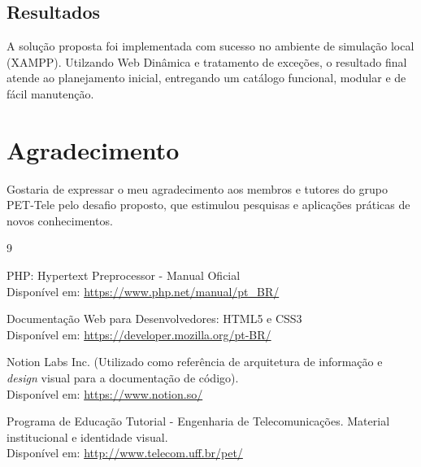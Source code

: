 \documentclass[12pt,a4paper]{article}
\begin{document}
\subsection{Resultados}
A solução proposta foi implementada com sucesso no ambiente de simulação local (XAMPP). Utilzando Web Dinâmica e tratamento de exceções, o resultado final atende ao planejamento inicial, entregando um catálogo funcional, modular e de fácil manutenção.

\newpage

\section*{Agradecimento}
Gostaria de expressar o meu agradecimento aos membros e tutores do grupo PET-Tele pelo desafio proposto, que estimulou pesquisas e aplicações práticas de novos conhecimentos.


\begin{thebibliography}{9}

    PHP: Hypertext Preprocessor - Manual Oficial \\
    Disponível em: \url{https://www.php.net/manual/pt_BR/}
    
    Documentação Web para Desenvolvedores: HTML5 e CSS3 \\ Disponível em: \url{https://developer.mozilla.org/pt-BR/}
    
    Notion Labs Inc. (Utilizado como referência de arquitetura de informação e \textit{design} visual para a documentação de código). \\
    Disponível em: \url{https://www.notion.so/}
    
    Programa de Educação Tutorial - Engenharia de Telecomunicações. Material institucional e identidade visual. \\
    Disponível em: \url{http://www.telecom.uff.br/pet/}

\end{thebibliography}
\end{document}
